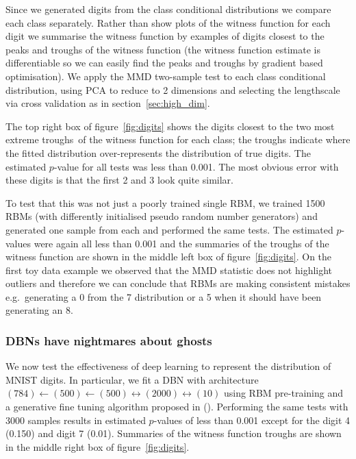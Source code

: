 \documentclass{article} %
\def\eg{e.g.\ }
\begin{document}
Since we generated digits from the class conditional distributions we compare each class separately.
Rather than show plots of the witness function for each digit we summarise the witness function by examples of digits closest to the peaks and troughs of the witness function (the witness function estimate is differentiable so we can easily find the peaks and troughs by gradient based optimisation).
We apply the MMD two-sample test to each class conditional distribution, using PCA to reduce to 2 dimensions and selecting the lengthscale via cross validation as in section~\ref{sec:high_dim}.

The top right box of figure~\ref{fig:digits} shows the digits closest to the two most extreme troughs\footnotemark~of the witness function for each class; the troughs indicate where the fitted distribution over-represents the distribution of true digits.
The estimated $p$-value for all tests was less than 0.001.
The most obvious error with these digits is that the first 2 and 3 look quite similar.

To test that this was not just a poorly trained single RBM, we trained 1500 RBMs (with differently initialised pseudo random number generators) and generated one sample from each and performed the same tests.
The estimated $p$-values were again all less than 0.001 and the summaries of the troughs of the witness function are shown in the middle left box of figure~\ref{fig:digits}.
On the first toy data example we observed that the MMD statistic does not highlight outliers and therefore we can conclude that RBMs are making consistent mistakes \eg generating a 0 from the 7 distribution or a 5 when it should have been generating an 8.

\subsubsection{DBNs have nightmares about ghosts}

We now test the effectiveness of deep learning to represent the distribution of MNIST digits.
In particular, we fit a DBN with architecture $(784)\leftarrow(500)\leftarrow(500)\leftrightarrow(2000)\leftrightarrow(10)$ using RBM pre-training and a generative fine tuning algorithm proposed in ().
Performing the same tests with 3000 samples results in estimated $p$-values of less than 0.001 except for the digit 4 (0.150) and digit 7 (0.01).
Summaries of the witness function troughs are shown in the middle right box of figure~\ref{fig:digits}.
\end{document}
